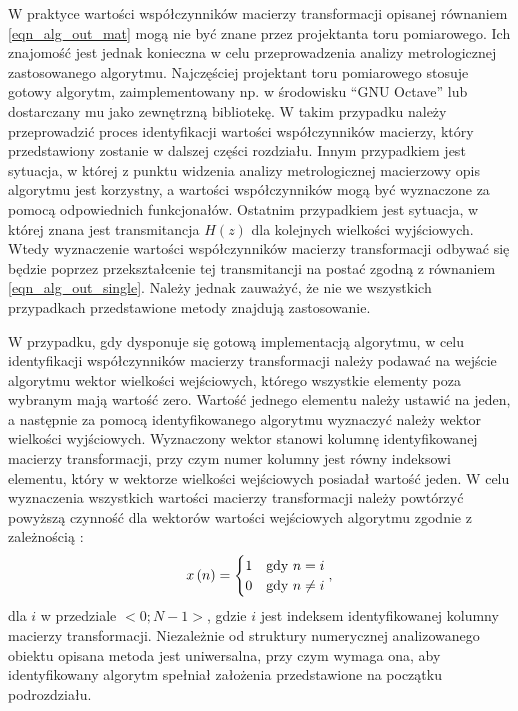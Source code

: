 W praktyce wartości współczynników macierzy transformacji opisanej równaniem \eqref{eqn_alg_out_mat} mogą nie być znane przez projektanta toru pomiarowego. Ich znajomość jest jednak konieczna w celu przeprowadzenia analizy metrologicznej zastosowanego algorytmu. Najczęściej projektant toru pomiarowego stosuje gotowy algorytm, zaimplementowany np. w środowisku \enquote{GNU Octave} lub dostarczany mu jako zewnętrzną bibliotekę. W takim przypadku należy przeprowadzić proces identyfikacji wartości współczynników macierzy, który przedstawiony zostanie w dalszej części rozdziału. Innym przypadkiem jest sytuacja, w której z punktu widzenia analizy metrologicznej macierzowy opis algorytmu jest korzystny, a wartości współczynników mogą być wyznaczone za pomocą odpowiednich funkcjonałów. Ostatnim przypadkiem jest sytuacja, w której znana jest transmitancja $H(z)$ dla kolejnych wielkości wyjściowych. Wtedy wyznaczenie wartości współczynników macierzy transformacji odbywać się będzie poprzez przekształcenie tej transmitancji na postać zgodną z równaniem \eqref{eqn_alg_out_single}. Należy jednak zauważyć, że nie we wszystkich przypadkach przedstawione metody znajdują zastosowanie.

W przypadku, gdy dysponuje się gotową implementacją algorytmu, w celu identyfikacji współczynników macierzy transformacji należy podawać na wejście algorytmu wektor wielkości wejściowych, którego wszystkie elementy poza wybranym mają wartość zero. Wartość jednego elementu należy ustawić na jeden, a następnie za pomocą identyfikowanego algorytmu wyznaczyć należy wektor wielkości wyjściowych. Wyznaczony wektor stanowi kolumnę identyfikowanej macierzy transformacji, przy czym numer kolumny jest równy indeksowi elementu, który w wektorze wielkości wejściowych posiadał wartość jeden. W celu wyznaczenia wszystkich wartości macierzy transformacji należy powtórzyć powyższą czynność dla wektorów wartości wejściowych algorytmu zgodnie z zależnością \cite{jakubiec_algorithms}:
\begin{equation}
x \left( n \right) =
\begin{cases}
	1 & $gdy$ ~ n = i \\
	0 & $gdy$ ~ n \neq i
\end{cases}
\label{eqn_wt_ident},
\end{equation}
dla $i$ w przedziale $<0;N-1>$, gdzie $i$ jest indeksem identyfikowanej kolumny macierzy transformacji. Niezależnie od struktury numerycznej analizowanego obiektu opisana metoda jest uniwersalna, przy czym wymaga ona, aby identyfikowany algorytm spełniał założenia przedstawione na początku podrozdziału.

